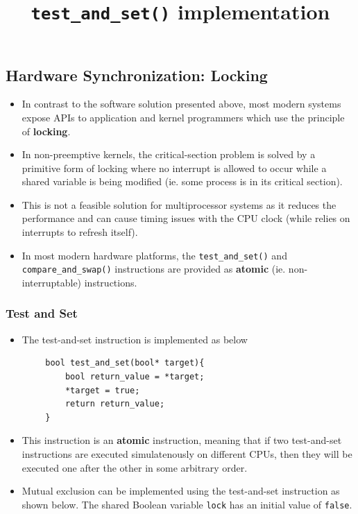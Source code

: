 \documentclass{article}
\theoremstyle{plain}
\theoremstyle{definition}
\begin{document}
\subsection{Hardware Synchronization: Locking}
\begin{itemize}
    \item In contrast to the software solution presented above, most modern systems expose APIs to application and kernel programmers which use the principle of \textbf{locking}.
    
    \item In non-preemptive kernels, the critical-section problem is solved by a primitive form of locking where no interrupt is allowed to occur while a shared variable is being modified (ie. some process is in its critical section). 
    
    \item This is not a feasible solution for multiprocessor systems as it reduces the performance and can cause timing issues with the CPU clock (while relies on interrupts to refresh itself).
    
    \item In most modern hardware platforms, the \texttt{test\_and\_set()} and \texttt{compare\_and\_swap()} instructions are provided as \textbf{atomic} (ie. non-interruptable) instructions. 
\end{itemize}

\subsubsection{Test and Set}
\begin{itemize}
    \item The test-and-set instruction is implemented as below
\end{itemize}
    \begin{listing}[ht]
    \centering
    \begin{verbatim}
        bool test_and_set(bool* target){
            bool return_value = *target;
            *target = true;
            return return_value;
        }
    \end{verbatim}
    \title{\texttt{test\_and\_set()} implementation}
    \end{listing}
\begin{itemize}
    \item This instruction is an \textbf{atomic} instruction, meaning that if two test-and-set instructions are executed simulatenously on different CPUs, then they will be executed one after the other in some arbitrary order.
    
    \item Mutual exclusion can be implemented using the test-and-set instruction as shown below.
    The shared Boolean variable \texttt{lock} has an initial value of \texttt{false}.
\end{itemize}
\end{document}
